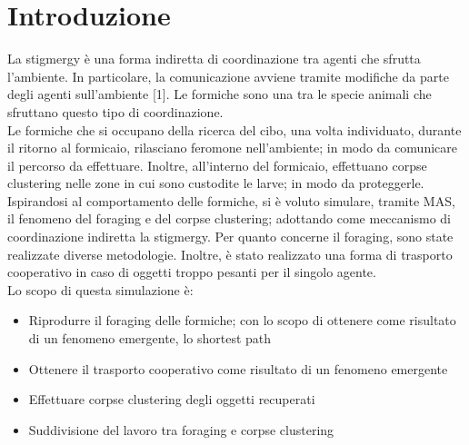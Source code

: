 \documentclass[12pt,a4paper,openright,twoside]{report}
\begin{document}
	\chapter*{Introduzione}                 %

La stigmergy è una forma indiretta di coordinazione tra agenti che sfrutta l'ambiente. In particolare, la comunicazione avviene tramite modifiche da parte degli agenti sull'ambiente [1]. Le formiche sono una tra le specie animali che sfruttano questo tipo di coordinazione.\\
Le formiche che si occupano della ricerca del cibo, una volta individuato, durante il ritorno al formicaio, rilasciano feromone nell'ambiente; in modo da comunicare il percorso da effettuare. Inoltre, all'interno del formicaio, effettuano corpse clustering nelle zone in cui sono custodite le larve; in modo da proteggerle.\\
Ispirandosi al comportamento delle formiche, si è voluto simulare, tramite MAS, il fenomeno del foraging e del corpse clustering; adottando come meccanismo di coordinazione indiretta la stigmergy. Per quanto concerne il foraging, sono state realizzate diverse metodologie. Inoltre, è stato realizzato una forma di trasporto cooperativo in caso di oggetti troppo pesanti per il singolo agente.\\
Lo scopo di questa simulazione è:

\begin{itemize}
	\item Riprodurre il foraging delle formiche; con lo scopo di ottenere come risultato di un fenomeno emergente, lo shortest path
	\item Ottenere il trasporto cooperativo come risultato di un fenomeno emergente
	\item Effettuare corpse clustering degli oggetti recuperati
	\item Suddivisione del lavoro tra foraging e corpse clustering
\end{itemize}
\end{document}

